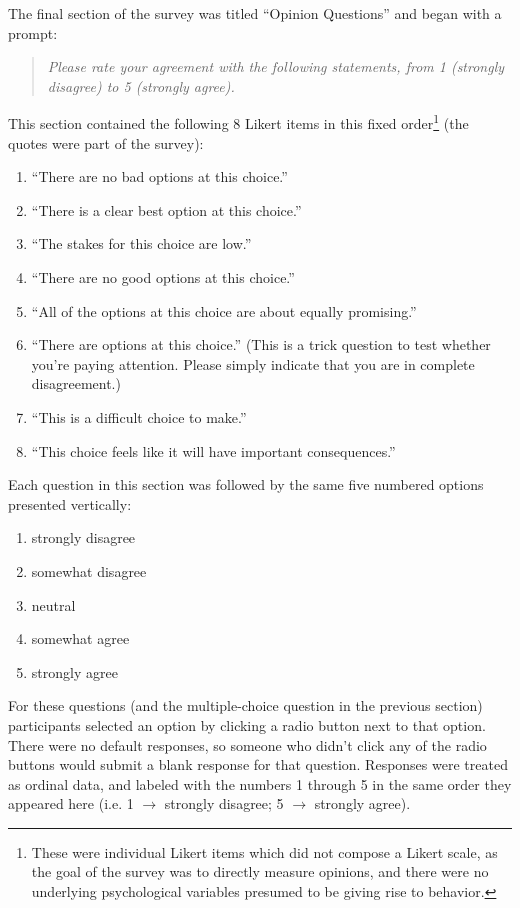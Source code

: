 The final section of the survey was titled ``Opinion Questions'' and began with a prompt:
%
\begin{quote}
  \slshape
Please rate your agreement with the following statements, from 1 (strongly disagree) to 5 (strongly agree).
\end{quote}
%
This section contained the following 8 Likert items in this fixed order\footnote{These were individual Likert items which did not compose a Likert scale, as the goal of the survey was to directly measure opinions, and there were no underlying psychological variables presumed to be giving rise to behavior.} (the quotes were part of the survey):
%
\begin{enumerate}
    \slshape
  \item ``There are no bad options at this choice.''
  \item ``There is a clear best option at this choice.''
  \item ``The stakes for this choice are low.''
  \item ``There are no good options at this choice.''
  \item ``All of the options at this choice are about equally promising.''
  \item ``There are options at this choice.'' (This is a trick question to test whether you're paying attention. Please simply indicate that you are in complete disagreement.)
  \item ``This is a difficult choice to make.''
  \item ``This choice feels like it will have important consequences.''
\end{enumerate}
%
Each question in this section was followed by the same five numbered options presented vertically:
%
\begin{enumerate}
    \slshape
  \item strongly disagree
  \item somewhat disagree
  \item neutral
  \item somewhat agree
  \item strongly agree
\end{enumerate}
%
For these questions (and the multiple-choice question in the previous section) participants selected an option by clicking a radio button next to that option. There were no default responses, so someone who didn't click any of the radio buttons would submit a blank response for that question.
%
Responses were treated as ordinal data, and labeled with the numbers 1 through 5 in the same order they appeared here (i.e. 1 $\rightarrow$ strongly disagree; 5 $\rightarrow$ strongly agree).

